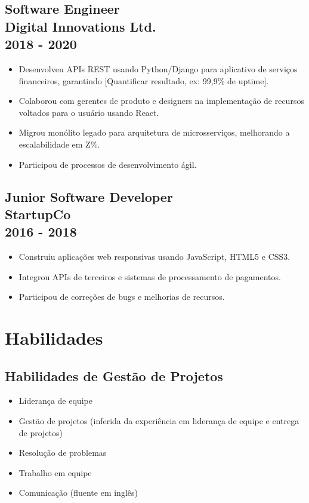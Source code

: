 \documentclass{article}
\begin{document}
\subsection*{Software Engineer \\ Digital Innovations Ltd. \\ 2018 - 2020}
\begin{itemize}
    \item Desenvolveu APIs REST usando Python/Django para aplicativo de serviços financeiros, garantindo [Quantificar resultado, ex:  99,9\% de uptime].
    \item Colaborou com gerentes de produto e designers na implementação de recursos voltados para o usuário usando React.
    \item Migrou monólito legado para arquitetura de microsserviços, melhorando a escalabilidade em Z\%.
    \item Participou de processos de desenvolvimento ágil.
\end{itemize}

\subsection*{Junior Software Developer \\ StartupCo \\ 2016 - 2018}
\begin{itemize}
    \item Construiu aplicações web responsivas usando JavaScript, HTML5 e CSS3.
    \item Integrou APIs de terceiros e sistemas de processamento de pagamentos.
    \item Participou de correções de bugs e melhorias de recursos.
\end{itemize}

\section*{Habilidades}
\subsection*{Habilidades de Gestão de Projetos}
\begin{itemize}
    \item Liderança de equipe
    \item Gestão de projetos (inferida da experiência em liderança de equipe e entrega de projetos)
    \item Resolução de problemas
    \item Trabalho em equipe
    \item Comunicação (fluente em inglês)
\end{itemize}
\end{document}
